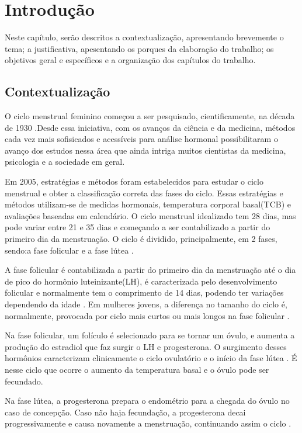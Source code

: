 \chapter*[Introdução]{Introdução}

Neste capítulo, serão descritos a contextualização, apresentando brevemente o tema; a justificativa, apesentando os porques da elaboração do trabalho; os objetivos geral e específicos e a organização dos capítulos do trabalho.

\section*{Contextualização}

O ciclo menstrual feminino começou a ser pesquisado, cientificamente, na década de 1930 \cite{frank1931}.Desde essa iniciativa, com os avanços da ciência e da medicina, métodos cada vez mais sofisicados e acessíveis para análise hormonal possibilitaram o avanço dos estudos nessa área que ainda intriga muitos cientistas da medicina, psicologia e a sociedade em geral.

Em 2005, estratégias e métodos foram estabelecidos para estudar o ciclo menstrual e obter a classificação correta das fases do ciclo\cite{becker2005}. Essas estratégias e métodos utilizam-se de medidas hormonais, temperatura corporal basal(TCB) e avaliações baseadas em calendário. O ciclo menstrual idealizado tem 28 dias, mas pode variar entre 21 e 35 dias \cite{lenton1984a} e começando a ser contabilizado a partir do primeiro dia da menstruação. O ciclo é dividido, principalmente, em 2 fases, sendo:a fase folicular e a fase lútea \cite{brondin2008}.

A fase folicular é contabilizada a partir do primeiro dia da menstruação até o dia de pico do hormônio luteinizante(LH), é caracterizada pelo desenvolvimento folicular e normalmente tem o comprimento de 14 dias, podendo ter variações dependendo da idade \cite{lenton1984a}. Em mulheres jovens, a diferença no tamanho do ciclo é, normalmente, provocada por ciclo mais curtos ou mais longos na fase folicular \cite{lenton1984a}.

Na fase folicular, um folículo é selecionado para se tornar um óvulo, e aumenta a produção do estradiol que faz surgir o LH e progesterona. O surgimento desses hormônios caracterizam clinicamente o ciclo ovulatório e o início da fase lútea \cite{fritz2010}. É nesse ciclo que ocorre o aumento da temperatura basal e o óvulo pode ser fecundado. 

Na fase lútea, a progesterona prepara o endométrio para a chegada do óvulo no caso de concepção. Caso não haja fecundação, a progesterona decai progressivamente e causa novamente a menstruação, continuando assim o ciclo \cite{nikas2003}.

